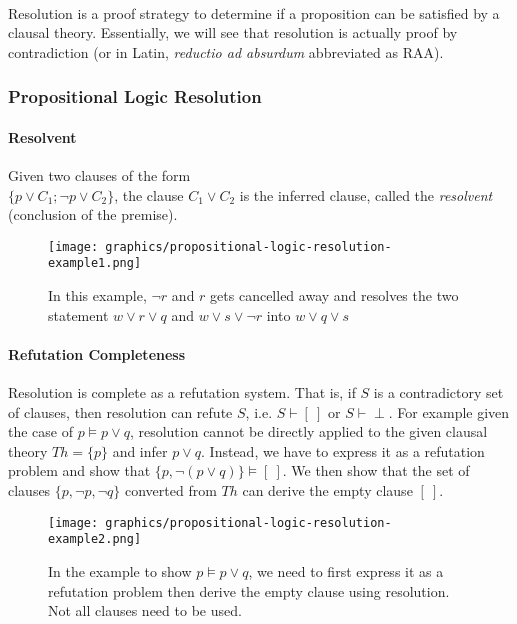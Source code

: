 \documentclass{article}
\theoremstyle{plain}
\theoremstyle{definition}
\begin{document}
\begin{multicols}{2}
\paragraph{} Resolution is a proof strategy to determine if a proposition can be satisfied by a clausal theory. Essentially, we will see that resolution is actually proof by contradiction (or in Latin, \textit{reductio ad absurdum} abbreviated as RAA).

\subsubsection{Propositional Logic Resolution}

\paragraph{Resolvent} Given two clauses of the form\\ $\{p \lor C_1; \lnot p \lor C_2\}$, the clause $C_1 \lor C_2$ is the inferred clause, called the \textit{resolvent} (conclusion of the premise).

\begin{figure}[H]
\centering
\texttt{[image: graphics/propositional-logic-resolution-example1.png]}
\caption{In this example, $\lnot r$ and $r$ gets cancelled away and resolves the two statement $w \lor r \lor q$ and $w \lor s \lor \lnot r$ into $w \lor q \lor s$}
\end{figure}

\paragraph{Refutation Completeness} Resolution is complete as a refutation system. That is, if $S$ is a contradictory set of clauses, then resolution can refute $S$, i.e. $S \vdash [\ ]$ or $S \vdash \perp$. For example given the case of $p \models p \lor q$, resolution cannot be directly applied to the given clausal theory $Th = \{p\}$ and infer $p \lor q$. Instead, we have to express it as a refutation problem and show that $\{p, \lnot(p \lor q)\} \models [\ ]$. We then show that the set of clauses $\{p, \lnot p, \lnot q\}$ converted from $Th$ can derive the empty clause $[\ ]$.

\begin{figure}[H]
\centering
\texttt{[image: graphics/propositional-logic-resolution-example2.png]}
\caption{In the example to show $p \models p \lor q$, we need to first express it as a refutation problem then derive the empty clause using resolution. Not all clauses need to be used.}
\end{figure}


\end{multicols}
\end{document}
